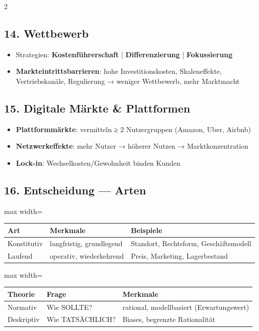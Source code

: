 \documentclass[10pt, a4paper]{article}
\begin{document}
\begin{multicols}{2}
\subsection{14. Wettbewerb}

\begin{itemize}
  \item Strategien: \textbf{Kostenführerschaft} | \textbf{Differenzierung} | \textbf{Fokussierung}
  \item \textbf{Markteintrittsbarrieren}: hohe Investitionskosten, Skaleneffekte, Vertriebskanäle, Regulierung → weniger Wettbewerb, mehr Marktmacht
\end{itemize}


\subsection{15. Digitale Märkte \& Plattformen}

\begin{itemize}
  \item \textbf{Plattformmärkte}: vermitteln ≥ 2 Nutzergruppen (Amazon, Uber, Airbnb)
  \item \textbf{Netzwerkeffekte}: mehr Nutzer → höherer Nutzen → Marktkonzentration
  \item \textbf{Lock-in}: Wechselkosten/Gewohnheit binden Kunden
\end{itemize}


\subsection{16. Entscheidung — Arten}


{\small
\begin{adjustbox}{max width=\linewidth}
{\scriptsize
\begin{tabular}{lll}
\toprule
\textbf{Art} & \textbf{Merkmale} & \textbf{Beispiele} \\
\midrule
Konstitutiv & langfristig, grundlegend & Standort, Rechtsform, Geschäftsmodell \\
Laufend & operativ, wiederkehrend & Preis, Marketing, Lagerbestand \\
\bottomrule
\end{tabular}
}
\end{adjustbox}
}



{\small
\begin{adjustbox}{max width=\linewidth}
{\scriptsize
\begin{tabular}{lll}
\toprule
\textbf{Theorie} & \textbf{Frage} & \textbf{Merkmale} \\
\midrule
Normativ & Wie SOLLTE? & rational, modellbasiert (Erwartungswert) \\
Deskriptiv & Wie TATSÄCHLICH? & Biases, begrenzte Rationalität \\
\bottomrule
\end{tabular}
}
\end{adjustbox}
}




\end{multicols}
\end{document}
